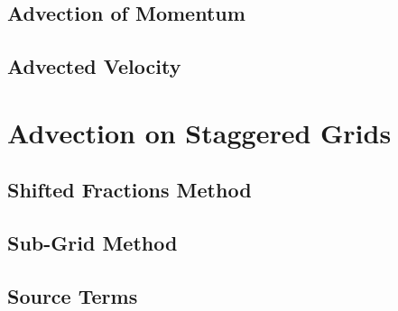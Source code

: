 \subsection*{Advection of Momentum}


\subsection*{Advected Velocity}





\section{Advection on Staggered Grids}


\subsection*{Shifted Fractions Method}


\subsection*{Sub-Grid Method}


\subsection*{Source Terms}

